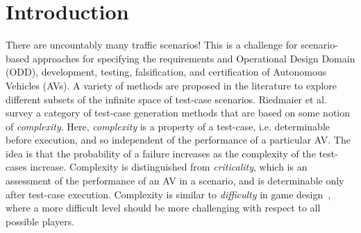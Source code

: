 \section{Introduction}





There are uncountably many traffic scenarios!
%
This is a challenge for scenario-based approaches for specifying the requirements and Operational Design Domain (ODD), development, testing, falsification, and certification of Autonomous Vehicles (AVs).
%
A variety of methods are proposed in the literature to explore different subsets of the infinite space of test-case scenarios.
%
Riedmaier et al. \cite{Riedmaier.2020} survey a category of test-case generation methods that are based on some notion of \emph{complexity}.
%
Here, \emph{complexity} is a property of a test-case, i.e. determinable before execution, and so independent of the performance of a particular AV.
%
The idea is that the probability of a failure increases as the complexity of the test-cases increase.
%
Complexity is distinguished from \emph{criticality}, which is an assessment of the performance of an AV in a scenario, and is determinable only after test-case execution.
%
Complexity is similar to \emph{difficulty} in game design~\cite{Aponte.2011}, where a more difficult level should be more challenging with respect to all possible players.



